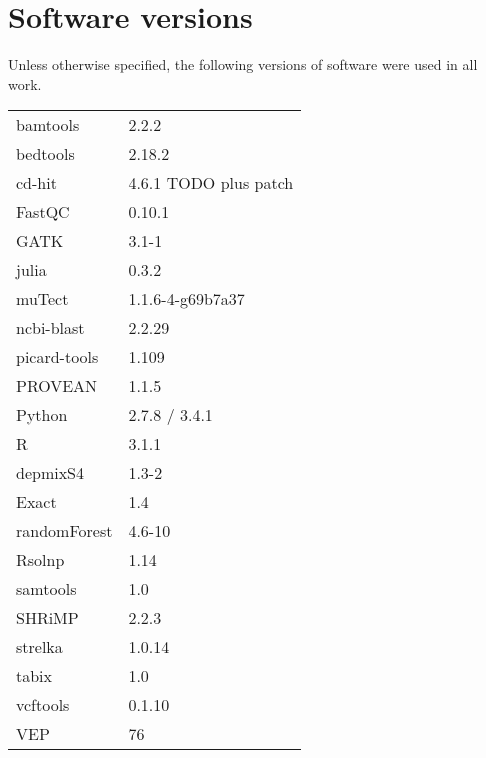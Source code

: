 \chapter*{Software versions}
Unless otherwise specified, the following versions of software were used in all work.

\begin{tabular}{ll}
\toprule
  bamtools                    & 2.2.2 \\
  bedtools                    & 2.18.2 \\
  cd-hit                      & 4.6.1 TODO plus patch \\
  FastQC                      & 0.10.1 \\
  GATK                        & 3.1-1 \\
  julia                       & 0.3.2 \\
  muTect                      & 1.1.6-4-g69b7a37 \\
  ncbi-blast                  & 2.2.29 \\
  picard-tools                & 1.109 \\
  PROVEAN                     & 1.1.5 \\
  Python                      & 2.7.8 / 3.4.1 \\
  R                           & 3.1.1 \\
  \quad depmixS4              & 1.3-2 \\
  \quad Exact                 & 1.4 \\
  \quad randomForest          & 4.6-10 \\
  \quad Rsolnp                & 1.14 \\
  samtools                    & 1.0 \\
  SHRiMP                      & 2.2.3 \\
  strelka                     & 1.0.14 \\
  tabix                       & 1.0 \\
  vcftools                    & 0.1.10 \\
  VEP                         & 76 \\
\bottomrule
\end{tabular}
